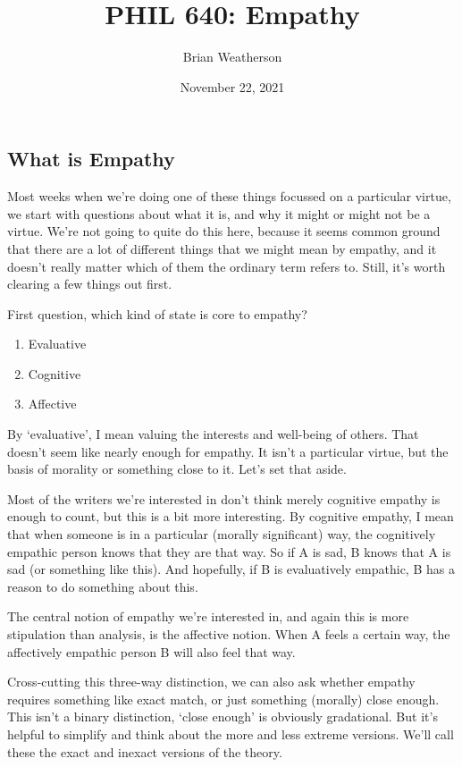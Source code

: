 \documentclass[
]{article}
\title{PHIL 640: Empathy}
\author{Brian Weatherson}
\date{November 22, 2021}
\providecommand{\tightlist}{%
  \setlength{\itemsep}{0pt}\setlength{\parskip}{0pt}}
\begin{document}
\maketitle

\hypertarget{what-is-empathy}{%
\subsection{What is Empathy}\label{what-is-empathy}}

Most weeks when we're doing one of these things focussed on a particular
virtue, we start with questions about what it is, and why it might or
might not be a virtue. We're not going to quite do this here, because it
seems common ground that there are a lot of different things that we
might mean by empathy, and it doesn't really matter which of them the
ordinary term refers to. Still, it's worth clearing a few things out
first.

First question, which kind of state is core to empathy?

\begin{enumerate}
\def\labelenumi{\arabic{enumi}.}
\tightlist
\item
  Evaluative
\item
  Cognitive
\item
  Affective
\end{enumerate}

By `evaluative', I mean valuing the interests and well-being of others.
That doesn't seem like nearly enough for empathy. It isn't a particular
virtue, but the basis of morality or something close to it. Let's set
that aside.

Most of the writers we're interested in don't think merely cognitive
empathy is enough to count, but this is a bit more interesting. By
cognitive empathy, I mean that when someone is in a particular (morally
significant) way, the cognitively empathic person knows that they are
that way. So if A is sad, B knows that A is sad (or something like
this). And hopefully, if B is evaluatively empathic, B has a reason to
do something about this.

The central notion of empathy we're interested in, and again this is
more stipulation than analysis, is the affective notion. When A feels a
certain way, the affectively empathic person B will also feel that way.

Cross-cutting this three-way distinction, we can also ask whether
empathy requires something like exact match, or just something (morally)
close enough. This isn't a binary distinction, `close enough' is
obviously gradational. But it's helpful to simplify and think about the
more and less extreme versions. We'll call these the exact and inexact
versions of the theory.
\end{document}
